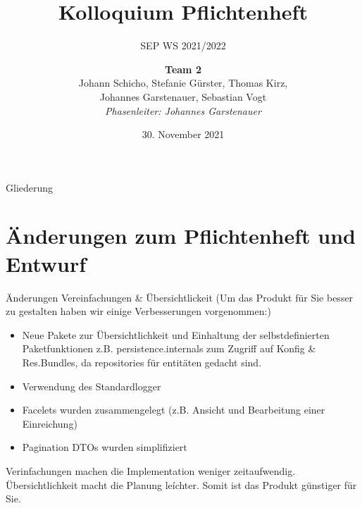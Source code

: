 \documentclass{beamer}
\title{Kolloquium Pflichtenheft}
\subtitle{SEP WS 2021/2022}
\date{\small 30. November 2021}
\author{\textbf{Team 2} \\ \small {Johann Schicho, Stefanie Gürster, Thomas Kirz,\\ Johannes Garstenauer, Sebastian Vogt} \\ \vspace{0.5cm}\emph{Phasenleiter: Johannes Garstenauer}\normalsize}
\begin{document}
    \begin{frame}
        \titlepage
    \end{frame}

    \begin{frame}{Gliederung}
        \tableofcontents
    \end{frame}


    \section{Änderungen zum Pflichtenheft und Entwurf}

    \begin{frame}{Änderungen}
        Vereinfachungen \& Übersichtlickeit
        (Um das Produkt für Sie besser zu gestalten haben wir einige Verbesserungen vorgenommen:)
        \begin{itemize}
            \item Neue Pakete zur Übersichtlichkeit und Einhaltung der selbstdefinierten Paketfunktionen
            z.B. persistence.internals zum Zugriff auf Konfig \& Res.Bundles, da repositories für entitäten gedacht sind.
            \item Verwendung des Standardlogger
            \item Facelets wurden zusammengelegt (z.B. Ansicht und Bearbeitung einer Einreichung)
            \item Pagination DTOs wurden simplifiziert
        \end{itemize}
        Verinfachungen machen die Implementation weniger zeitaufwendig.
        Übersichtlichkeit macht die Planung leíchter.
        Somit ist das Produkt günstiger für Sie.
    \end{frame}
\end{document}
